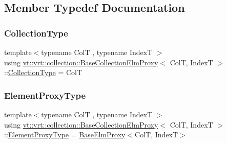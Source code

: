 \subsection{Member Typedef Documentation}
\mbox{\label{structvt_1_1vrt_1_1collection_1_1_base_collection_elm_proxy_aa3c92d3ae462d11b71c59af00855e414}} 
\subsubsection{\texorpdfstring{Collection\+Type}{CollectionType}}
{\footnotesize\ttfamily template$<$typename ColT , typename IndexT $>$ \\
using \hyperlink{structvt_1_1vrt_1_1collection_1_1_base_collection_elm_proxy}{vt\+::vrt\+::collection\+::\+Base\+Collection\+Elm\+Proxy}$<$ ColT, IndexT $>$\+::\hyperlink{structvt_1_1vrt_1_1collection_1_1_base_collection_elm_proxy_aa3c92d3ae462d11b71c59af00855e414}{Collection\+Type} =  ColT}

\mbox{\label{structvt_1_1vrt_1_1collection_1_1_base_collection_elm_proxy_a0f37a49c04c28fdc6ea8665aefc2f40c}} 
\subsubsection{\texorpdfstring{Element\+Proxy\+Type}{ElementProxyType}}
{\footnotesize\ttfamily template$<$typename ColT , typename IndexT $>$ \\
using \hyperlink{structvt_1_1vrt_1_1collection_1_1_base_collection_elm_proxy}{vt\+::vrt\+::collection\+::\+Base\+Collection\+Elm\+Proxy}$<$ ColT, IndexT $>$\+::\hyperlink{structvt_1_1vrt_1_1collection_1_1_base_collection_elm_proxy_a0f37a49c04c28fdc6ea8665aefc2f40c}{Element\+Proxy\+Type} =  \hyperlink{structvt_1_1vrt_1_1collection_1_1_base_elm_proxy}{Base\+Elm\+Proxy}$<$ColT, IndexT$>$}

